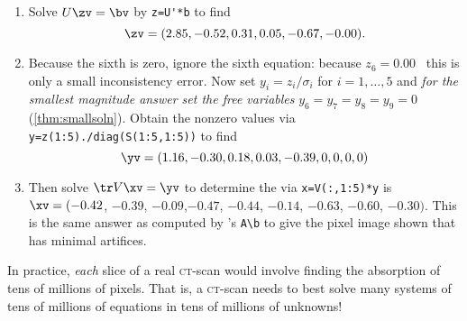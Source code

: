 \begin{example}
\begin{enumerate}
\item Solve \(U\zv=\bv\) by \verb|z=U'*b| to find
\begin{equation*}
\zv=(2.85,-0.52, 0.31, 0.05,-0.67,-0.00).
\end{equation*}

\item Because the sixth  is zero, ignore the sixth equation: because \(z_6=0.00\) \twodp\ this is only a small inconsistency error.
Now set $y_i=z_i/\sigma_i$ for \(i=1,\ldots,5\) and \emph{for the smallest magnitude answer set the free variables} \(y_6=y_7=y_8=y_9=0\) (\autoref{thm:smallsoln}).
Obtain the nonzero values via \verb|y=z(1:5)./diag(S(1:5,1:5))| to find
\begin{equation*}
\yv=(1.16,-0.30, 0.18, 0.03,-0.39,0,0,0,0)
\end{equation*}

\item Then solve \(\tr V\xv=\yv\) to determine the  via \verb|x=V(:,1:5)*y| is
\(\xv= (-0.42\), \(-0.39\), \(-0.09\),\( -0.47\), \(-0.44\), \(-0.14\), \(-0.63\), \(-0.60\), \(-0.30)\).
%
This is the same answer as computed by \script[2]'s \verb|A\b| to give the pixel image shown that has minimal artifices.
\end{enumerate}
In practice, \emph{each} slice of a real \textsc{ct}-scan would involve finding the absorption of tens of millions of pixels.
That is, a \textsc{ct}-scan needs to best solve many systems of tens of millions of equations in tens of millions of unknowns!
\end{example}



